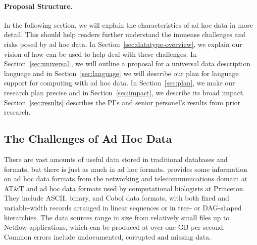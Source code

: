 \documentclass[11pt]{article}
\begin{document}
\paragraph*{Proposal Structure.}
In the following section, we will explain the characteristics
of ad hoc data in more detail.  This should help readers further understand
the immense challenges and risks posed by ad hoc data.  
In Section~\ref{sec:datatype-overview}, we
explain our vision of how \datatype{} can be used to help deal with these
challenges.  In Section~\ref{sec:universal}, we will outline a proposal
for a universal data description language and in Section~\ref{sec:language}
we will describe our plan for language support for computing with
ad hoc data.  In Section~\ref{sec:plan}, we make our research plan precise
and in Section~\ref{sec:impact}, we describe its broad impact.
Section~\ref{sec:results} describes the PI's and senior personel's
results from prior research.

\subsection{The Challenges of Ad Hoc Data}
\label{sec:challenges}

There are vast amounts of useful data stored in traditional databases
and \xml{} formats, but there is just as much in ad hoc formats.
 provides some information on ad hoc data
formats from the networking and telecommunications domain at AT\&T and
ad hoc data formats used by computational biologists at Princeton.
They include ASCII, binary, and Cobol data formats, with both fixed
and variable-width records arranged in linear sequences or in tree- or
DAG-shaped hierarchies.  The data sources range in size from
relatively small files up to Netflow
applications, which can be produced at over one GB per second.  Common
errors include undocumented, corrupted and missing data.
\end{document}
